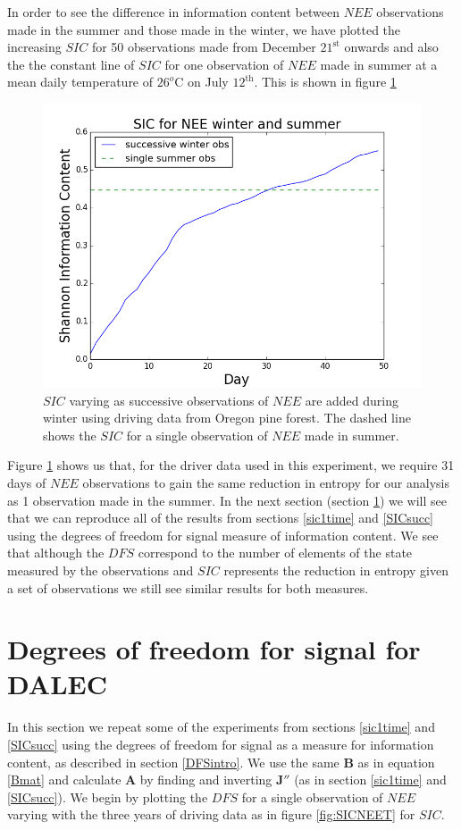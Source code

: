\documentclass[11pt]{article}
\begin{document}
In order to see the difference in information content between $NEE$ observations made in the summer and those made in the winter, we have plotted the increasing $SIC$ for 50 observations made from December $21^{\text{st}}$ onwards and also the the constant line of $SIC$ for one observation of $NEE$ made in summer at a mean daily temperature of $26^{o}\text{C}$ on July $12^{\text{th}}$. This is shown in figure \ref{summwintsic}

\begin{figure}[h]
\centering
\includegraphics[height=.34\textwidth]{succwinter_singlesummer.png}
\caption{$SIC$ varying as successive observations of $NEE$ are added during winter using driving data from Oregon pine forest. The dashed line shows the $SIC$ for a single observation of $NEE$ made in summer.}
\label{summwintsic}
\end{figure}

Figure \ref{summwintsic} shows us that, for the driver data used in this experiment, we require 31 days of $NEE$ observations to gain the same reduction in entropy for our analysis as 1 observation made in the summer. In the next section (section \ref{DOFS}) we will see that we can reproduce all of the results from sections \ref{sic1time} and \ref{SICsucc} using the degrees of freedom for signal measure of information content. We see that although the $DFS$ correspond to the number of elements of the state measured by the observations and $SIC$ represents the reduction in entropy given a set of observations we still see similar results for both measures.

\section{Degrees of freedom for signal for DALEC} \label{DOFS}%

In this section we repeat some of the experiments from sections \ref{sic1time} and \ref{SICsucc} using the degrees of freedom for signal as a  measure for information content, as described in section \ref{DFSintro}. We use the same $\mathbf{B}$ as in equation \ref{Bmat} and calculate $\mathbf{A}$ by finding and inverting $\mathbf{J}''$ (as in section \ref{sic1time} and \ref{SICsucc}). We begin by plotting the $DFS$ for a single observation of $NEE$ varying with the three years of driving data as in figure \ref{fig:SICNEET} for $SIC$.
\end{document}
